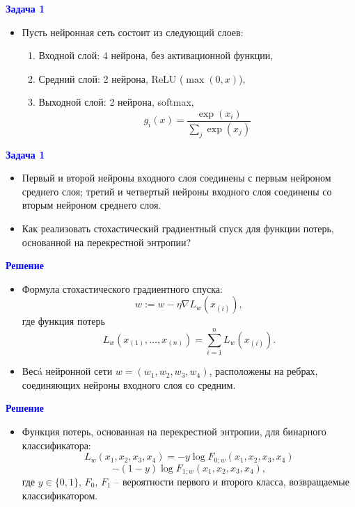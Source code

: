 \documentclass[landscape]{slides}
\begin{document}
\begin{slide}
\textbf{\textcolor{blue}{Задача 1}}

\begin{itemize}
\item Пусть нейронная сеть состоит из следующий слоев:
\begin{enumerate}
\item Входной слой: 4 нейрона, без активационной функции,
\item Средний слой: 2 нейрона, ReLU ($\max(0,x)$),
\item Выходной слой: 2 нейрона, softmax,
$$ g_i(x) = \frac{\exp(x_i)}{\sum_j \exp(x_j)} $$
\end{enumerate}
\end{itemize}
\end{slide}



\begin{slide}
\textbf{\textcolor{blue}{Задача 1}}

\begin{itemize}
\item Первый и второй нейроны входного слоя соединены с первым нейроном среднего слоя;
третий и четвертый нейроны входного слоя соединены со вторым нейроном среднего слоя.
\item Как реализовать стохастический градиентный спуск для функции потерь, основанной на перекрестной энтропии?
\end{itemize}
\end{slide}


\begin{slide}
\textbf{\textcolor{blue}{Решение}}

\begin{itemize}
\item Формула стохастического градиентного спуска:
$$ w := w - \eta \nabla L_w(x_{(i)}), $$
где функция потерь
$$ L_w(x_{(1)},\ldots,x_{(n)}) = \sum_{i=1}^n L_w(x_{(i)}).$$
\item Вес\'a нейронной сети $w=(w_1,w_2,w_3,w_4)$, расположены на ребрах,
соединяющих нейроны входного слоя со средним.
\end{itemize}
\end{slide}


\begin{slide}
\textbf{\textcolor{blue}{Решение}}

\begin{itemize}
\item Функция потерь, основанная на перекрестной энтропии, для бинарного классификатора:
$$ L_w(x_1,x_2,x_3,x_4) = - y\log F_{0;w}(x_1,x_2,x_3,x_4)$$
$$ - (1-y) \log F_{1;w}(x_1,x_2,x_3,x_4),$$
где $y\in\{0,1\}$, $F_0$, $F_1$ -- вероятности первого и второго класса, возвращаемые классификатором.
\end{itemize}
\end{slide}
\end{document}
